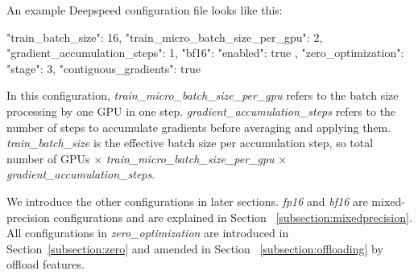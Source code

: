 An example Deepspeed configuration file looks like this:

\begin{json}
{
    "train_batch_size": 16,
    "train_micro_batch_size_per_gpu": 2,
    "gradient_accumulation_steps": 1,
    "bf16": {
        "enabled": true
    },
    "zero_optimization": {
        "stage": 3,
        "contiguous_gradients": true
    }
}
\end{json}

In this configuration, \textit{train\_micro\_batch\_size\_per\_gpu} refers to the 
batch size processing by one GPU in one step. \textit{gradient\_accumulation\_steps} 
refers to the number of steps to accumulate gradients before averaging and applying 
them. \textit{train\_batch\_size} is the effective batch size per accumulation step, 
so total number of GPUs $\times$ \textit{train\_micro\_batch\_size\_per\_gpu} $\times$ 
\textit{gradient\_accumulation\_steps}. 

We introduce the other configurations in later sections. \textit{fp16} and 
\textit{bf16} are mixed-precision configurations and are explained in Section~
\ref{subsection:mixedprecision}. All configurations in \textit{zero\_optimization} 
are introduced in Section~\ref{subsection:zero} and amended in Section~
\ref{subsection:offloading} by offload features.